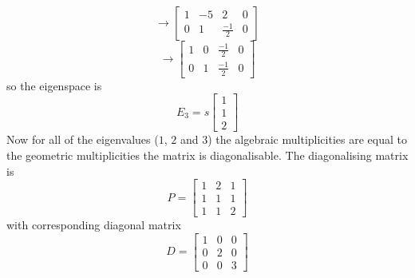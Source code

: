 \documentclass{article}
\begin{document}
\begin{Answer}
  \begin{equation*}
  \rightarrow\left[
  \begin{array}{ccc|c}
  1&-5&2&0\\
  0&1&\frac{-1}{2}&0
  \end{array}
  \right]
  \end{equation*}
  \begin{equation*}
  \rightarrow\left[
  \begin{array}{ccc|c}
  1&0&\frac{-1}{2}&0\\
  0&1&\frac{-1}{2}&0
  \end{array}
  \right]
  \end{equation*}
  so the eigenspace is
  \begin{equation*}
  E_3 = s \left[
  \begin{array}{c}
  1\\
  1\\
  2
  \end{array}
  \right]
  \end{equation*}
  Now for all of the eigenvalues ($1$, $2$ and $3$) the algebraic multiplicities are equal to the geometric multiplicities the matrix is diagonalisable. The diagonalising matrix is 
  \begin{equation*}
  P = \left[
  \begin{array}{ccc}
  1& 2 & 1\\
  1& 1& 1\\
  1& 1 &2
  \end{array}
  \right]
  \end{equation*}
  with corresponding diagonal matrix
  \begin{equation*}
  D = \left[
  \begin{array}{ccc}
  1 & 0 & 0\\
  0&2&0\\
  0&0&3
  \end{array}
  \right]
  \end{equation*}
\end{Answer}

\shipoutAnswer



\end{document}
